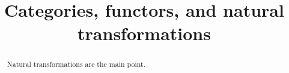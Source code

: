 \documentclass{ximera}
\title{Categories, functors, and natural transformations}
\begin{document}
\begin{abstract}
  Natural transformations are the main point.
\end{abstract}
\maketitle
\end{document}
